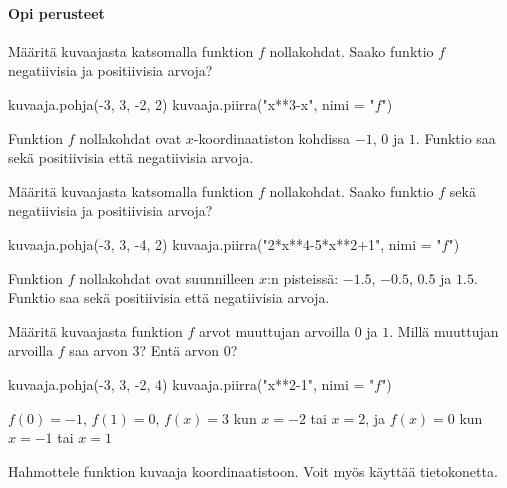 \begin{tehtavasivu}

\paragraph*{Opi perusteet}
\begin{tehtava}
Määritä kuvaajasta katsomalla funktion \(f\) nollakohdat. Saako funktio \(f\) negatiivisia ja positiivisia arvoja?
\begin{kuva}
    kuvaaja.pohja(-3, 3, -2, 2)
    kuvaaja.piirra("x**3-x", nimi = "$f$")
\end{kuva}
\begin{vastaus}
Funktion \(f\) nollakohdat ovat $x$-koordinaatiston kohdissa $-1$, $0$ ja $1$. Funktio saa sekä positiivisia että negatiivisia arvoja.
\end{vastaus}
\end{tehtava}

\begin{tehtava}
Määritä kuvaajasta katsomalla funktion \(f\) nollakohdat. Saako funktio \(f\) sekä negatiivisia ja positiivisia arvoja?
\begin{kuva}
    kuvaaja.pohja(-3, 3, -4, 2)
    kuvaaja.piirra("2*x**4-5*x**2+1", nimi = "$f$")
\end{kuva}
\begin{vastaus}
Funktion \(f\) nollakohdat ovat suunnilleen $x$:n pisteissä: $-1.5$, $-0.5$, $0.5$ ja $1.5$. Funktio saa sekä positiivisia että negatiivisia arvoja.
\end{vastaus}
\end{tehtava}

\begin{tehtava}
Määritä kuvaajasta funktion \(f\) arvot muuttujan arvoilla $0$ ja $1$. Millä muuttujan arvoilla \(f\) saa arvon \(3\)? Entä arvon \(0\)?
\begin{kuva}
    kuvaaja.pohja(-3, 3, -2, 4)
    kuvaaja.piirra("x**2-1", nimi = "$f$")
\end{kuva}
\begin{vastaus}
 $f(0)=-1$, $f(1)=0$, $f(x)=3$ kun $x=-2$ tai $x=2$, ja $f(x)=0$ kun $x=-1$ tai $x=1$
\end{vastaus}
\end{tehtava}


\begin{tehtava}
Hahmottele funktion kuvaaja koordinaatistoon. Voit myös käyttää tietokonetta.
\begin{alakohdat}
\end{alakohdat}


\end{tehtava}
\end{tehtavasivu}
